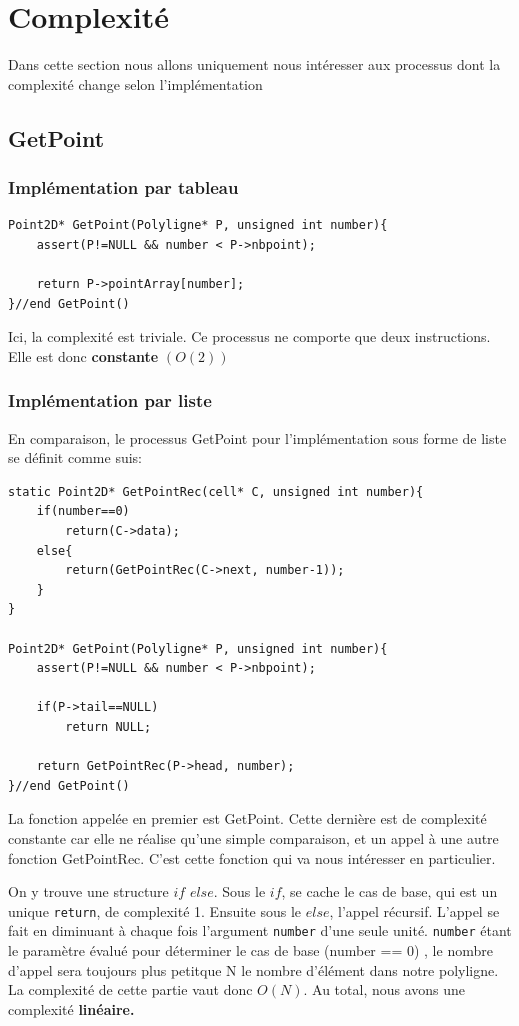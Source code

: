 \documentclass[a4paper, 11pt, oneside]{article}
\begin{document}
\section{Complexité}
Dans cette section nous allons uniquement nous intéresser aux processus dont la complexité change selon l'implémentation
\subsection{GetPoint}
\subsubsection{Implémentation par tableau}

\begin{lstlisting}
Point2D* GetPoint(Polyligne* P, unsigned int number){
    assert(P!=NULL && number < P->nbpoint);

    return P->pointArray[number];
}//end GetPoint()
\end{lstlisting}
Ici, la complexité est triviale. Ce processus ne comporte que deux instructions. Elle est donc \textbf{constante} $(O(2))$ 



\subsubsection{Implémentation par liste}
En comparaison, le processus GetPoint pour l'implémentation sous forme de liste se définit comme suis: 

\begin{lstlisting}
static Point2D* GetPointRec(cell* C, unsigned int number){
    if(number==0)
        return(C->data);
    else{       
        return(GetPointRec(C->next, number-1));
    }
}

Point2D* GetPoint(Polyligne* P, unsigned int number){
    assert(P!=NULL && number < P->nbpoint);

    if(P->tail==NULL)
        return NULL;

    return GetPointRec(P->head, number);
}//end GetPoint()
\end{lstlisting}
La fonction appelée en premier est GetPoint. Cette dernière est de complexité constante car elle ne réalise qu’une simple comparaison, et un appel à une autre fonction GetPointRec. C’est cette fonction qui va  nous intéresser en particulier.

\bigskip

On y trouve une structure $if$  $else$. Sous le $if$, se cache le cas de base, qui est un unique \texttt{return}, de complexité 1.
Ensuite sous le $else$, l’appel récursif.  L’appel se fait en diminuant à chaque fois l'argument \texttt{number} d’une seule unité. \texttt{number} étant le paramètre évalué pour déterminer le cas de base (number == 0) , le nombre d’appel sera toujours plus petitque  N le nombre d’élément dans notre polyligne. 
La complexité de cette partie vaut donc  $O(N)$.
Au total, nous avons une complexité \textbf{linéaire.} 
\end{document}
